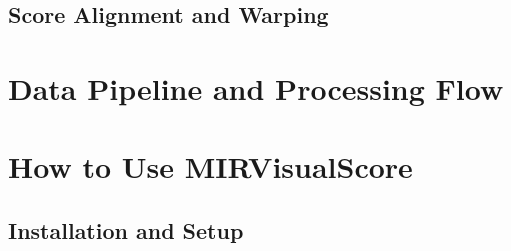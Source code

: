 \subsection{Score Alignment and Warping}


\section{Data Pipeline and Processing Flow}


\section{How to Use MIRVisualScore}




\subsection{Installation and Setup}



